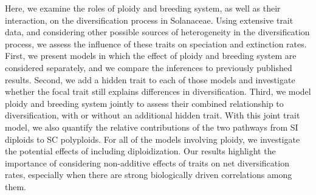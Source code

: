 Here, we examine the roles of ploidy and breeding system, as well as their interaction, on the diversification process in Solanaceae.
Using extensive trait data, and considering other possible sources of heterogeneity in the diversification process, we assess the influence of these traits on speciation and extinction rates.
First, we present models in which the effect of ploidy and breeding system are considered separately, and we compare the inferences to previously published results. 
Second, we add a hidden trait to each of those models and investigate whether the focal trait still explains differences in diversification.
Third, we model ploidy and breeding system jointly to assess their combined relationship to diversification, with or without an additional hidden trait.
With this joint trait model, we also quantify the relative contributions of the two pathways from SI diploids to SC polyploids.
For all of the models involving ploidy, we investigate the potential effects of including diploidization.
Our results highlight the importance of considering non-additive effects of traits on net diversification rates, especially when there are strong biologically driven correlations among them.
